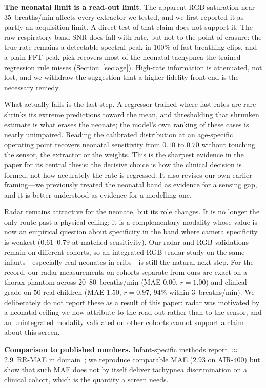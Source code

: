 \documentclass[journal]{IEEEtran}
\begin{document}
\textbf{The neonatal limit is a read-out limit.} The apparent RGB saturation near $35$~breaths/min
affects every extractor we tested, and we first reported it as partly an acquisition limit. A direct
test of that claim does not support it. The raw respiratory-band SNR does fall with rate, but not to
the point of erasure: the true rate remains a detectable spectral peak in $100\%$ of fast-breathing
clips, and a plain FFT peak-pick recovers most of the neonatal tachypnea the trained regression rule
misses (Section~\ref{sec:age}). High-rate information is attenuated, not lost, and we withdraw the
suggestion that a higher-fidelity front end is the necessary remedy.

What actually fails is the last step. A regressor trained where fast rates are rare shrinks its
extreme predictions toward the mean, and thresholding that shrunken estimate is what erases the
neonate; the model's own ranking of these cases is nearly unimpaired. Reading the calibrated
distribution at an age-specific operating point recovers neonatal sensitivity from $0.10$ to $0.70$
without touching the sensor, the extractor or the weights. This is the sharpest evidence in the paper
for its central thesis: the decisive choice is how the clinical decision is formed, not how accurately
the rate is regressed. It also revises our own earlier framing---we previously treated the neonatal
band as evidence for a sensing gap, and it is better understood as evidence for a modelling one.

Radar remains attractive for the neonate, but its role changes. It is no longer the only route past a
physical ceiling; it is a complementary modality whose value is now an empirical question about
specificity in the band where camera specificity is weakest ($0.61$--$0.79$ at matched sensitivity).
Our radar and RGB validations remain on different cohorts, so an integrated RGB$+$radar study on the
same infants---especially real neonates in cribs---is still the natural next step. For the record, our
radar measurements on cohorts separate from ours are exact on a thorax phantom across
$20$--$80$~breaths/min (MAE $0.00$, $r{=}1.00$) and clinical-grade on $50$ real children (MAE $1.50$,
$r{=}0.97$, $94\%$ within $3$~breaths/min). We deliberately do not report these as a result of this
paper: radar was motivated by a neonatal ceiling we now attribute to the read-out rather than to the
sensor, and an unintegrated modality validated on other cohorts cannot support a claim about this
screen.

\textbf{Comparison to published numbers.} Infant-specific methods report $\approx$2.9~RR-MAE in
domain~\cite{infant_air}; we reproduce comparable MAE ($2.93$ on AIR-400) but show that such MAE does not
by itself deliver tachypnea discrimination on a clinical cohort, which is the quantity a screen needs.
\end{document}
